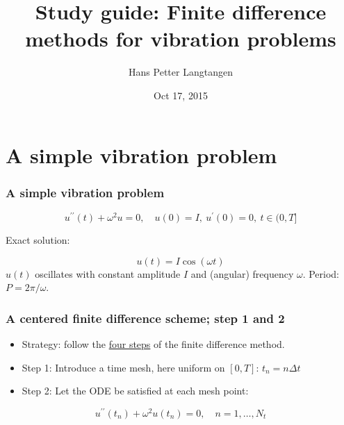 \documentclass{beamer}
\begin{document}








\title{Study guide: Finite difference methods for vibration problems}


\author{Hans Petter Langtangen}

\date{Oct 17, 2015
}

\begin{frame}
\titlepage
\end{frame}

\section{A simple vibration problem}

\begin{frame}
\frametitle{A simple vibration problem}



\[
u^{\prime\prime}(t) + \omega^2u = 0,\quad u(0)=I,\ u^{\prime}(0)=0,\ t\in (0,T]
\]

Exact solution:

\[
u(t) = I\cos (\omega t)
\]
$u(t)$ oscillates with constant amplitude $I$ and
(angular) frequency $\omega$.
Period: $P=2\pi/\omega$.


\end{frame}

\begin{frame}
\frametitle{A centered finite difference scheme; step 1 and 2}

\label{vib:model1:fdm}

\begin{itemize}
 \item Strategy: follow the \href{{http://tinyurl.com/opdfafk/pub/sphinx-decay/main_decay.html#the-forward-euler-scheme}}{four steps} of the finite difference method.

 \item Step 1: Introduce a time mesh, here uniform on $[0,T]$: $t_n=n\Delta t$

 \item Step 2: Let the ODE be satisfied at each mesh point:
\end{itemize}

\noindent
\[
u^{\prime\prime}(t_n) + \omega^2u(t_n) = 0,\quad n=1,\ldots,N_t
\]
\end{frame}
\end{document}

